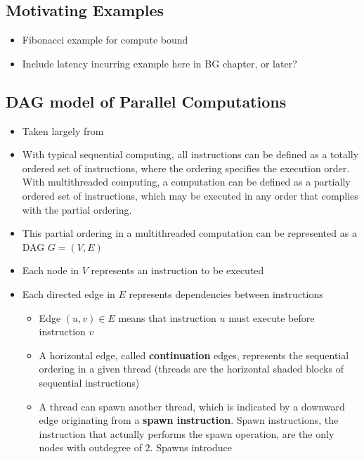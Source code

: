 \documentclass[bsc,frontabs,singlespacing,parskip,deptreport,normalheadings]{infthesis}
\begin{document}
\subsection{Motivating Examples}

\begin{itemize}
    \item Fibonacci example for compute bound
    \item Include latency incurring example here in BG chapter, or later?
\end{itemize}

\subsection{DAG model of Parallel Computations}

\begin{itemize}
    \item Taken largely from \cite{cormen_introduction_2009, herlihy_art_2012,
        blumofe_executing_1995}
    \item With typical sequential computing, all instructions can be defined as
        a totally ordered set of instructions, where the ordering specifies the
        execution order. With multithreaded computing, a computation can be
        defined as a partially ordered set of instructions, which may be
        executed in any order that complies with the partial ordering.
    \item This partial ordering in a multithreaded computation can be
        represented as a DAG \(G = (V, E)\)
    \item Each node in \(V\) represents an instruction to be executed
    \item Each directed edge in \(E\) represents dependencies between
        instructions
    \begin{itemize}
        \item Edge \((u,v) \in E\) means that instruction \(u\) must execute
            before instruction \(v\)
        \item A horizontal edge, called \textbf{continuation} edges, represents
            the sequential ordering in a given thread (threads are the
            horizontal shaded blocks of sequential instructions)
        \item A thread can spawn another thread, which is indicated by a
            downward edge originating from a \textbf{spawn instruction}. Spawn
            instructions, the instruction that actually performs the spawn
            operation, are the only nodes with outdegree of 2. Spawns introduce

\end{itemize}
\end{itemize}
\end{document}
